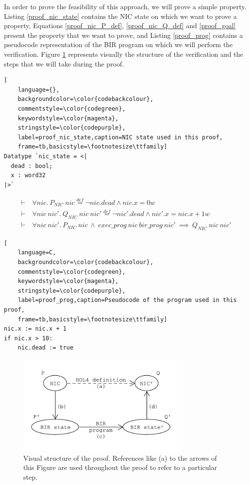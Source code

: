 \documentclass{kththesis}
\newcommand{\eqdef}{\stackrel{def}{=}}
\begin{document}
{%

In order to prove the feasibility of this approach, we will prove a simple property. Listing \ref{proof_nic_state} contains the NIC state on which we want to prove a property, Equations \ref{proof_nic_P_def}, \ref{proof_nic_Q_def} and \ref{proof_goal} present the property that we want to prove, and Listing \ref{proof_prog} contains a pseudocode representation of the BIR program on which we will perform the verification. Figure \ref{proof_schema} represents visually the structure of the verification and the steps that we will take during the proof. 

\begin{lstlisting}[
    language={},
    backgroundcolor=\color{codebackcolour},
    commentstyle=\color{codegreen},
    keywordstyle=\color{magenta},
    stringstyle=\color{codepurple},
    label=proof_nic_state,caption=NIC state used in this proof,
    frame=tb,basicstyle=\footnotesize\ttfamily]
Datatype `nic_state = <|
  dead : bool;
  x : word32
|>`
\end{lstlisting}

\begin{small}
\begin{align}
\label{proof_nic_P_def}
\vdash~&\forall nic.~P_{NIC}~nic \eqdef \neg nic.dead \land nic.x = 0w\\
%
\label{proof_nic_Q_def}
\vdash~&\forall nic~nic'.~Q_{NIC}~nic~nic' \eqdef \neg nic'.dead \land nic'.x = nic.x + 1w\\
%
\label{proof_goal}
\vdash~&\forall nic~nic'.~P_{NIC}~nic~\land~exec\_prog~nic~bir\_prog~nic'~\implies~Q_{NIC}~nic~nic'
\end{align}
\end{small}

\begin{lstlisting}[
    language=C,
    backgroundcolor=\color{codebackcolour},
    commentstyle=\color{codegreen},
    keywordstyle=\color{magenta},
    stringstyle=\color{codepurple},
    label=proof_prog,caption=Pseudocode of the program used in this proof,
    frame=tb,basicstyle=\footnotesize\ttfamily]
nic.x := nic.x + 1
if nic.x > 10:
    nic.dead := true
\end{lstlisting}

\begin{figure}[!h]
	\includegraphics[height=5cm]{figures/proof_schema.png}
	\centering
	\caption{Visual structure of the proof. References like (a) to the arrows of this Figure are used throughout the proof to refer to a particular step.}
	\label{proof_schema}
\end{figure}

}
\end{document}
